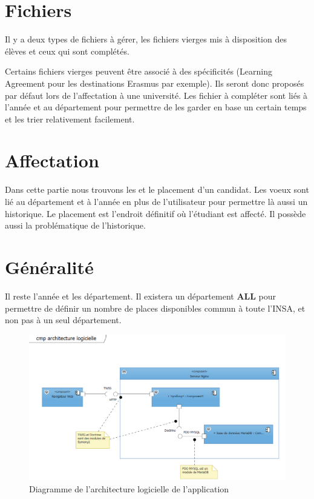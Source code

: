 \section{Fichiers}

Il y a deux types de fichiers à gérer, les fichiers vierges mis à disposition des élèves et ceux qui sont complétés.

Certains fichiers vierges peuvent être associé à des spécificités (Learning Agreement pour les destinations Erasmus par exemple). Ils seront donc proposés par défaut lors de l'affectation à une université.
Les fichier à compléter sont liés à l'année et au département pour permettre de les garder en base un certain temps et les trier relativement facilement.

\section{Affectation}

Dans cette partie nous trouvons les \voe et le placement d'un candidat. Les voeux sont lié au département et à l'année en plus de l'utilisateur pour permettre là aussi un historique.
Le placement est l'endroit définitif où l'étudiant est affecté. Il possède aussi la problématique de l'historique.

\section{Généralité}

Il reste l'année et les département. 
Il existera un département \textbf{ALL} pour permettre de définir un nombre de places disponibles commun à toute l'INSA, et non pas à un seul département.


\begin{figure}[h!]
	\centering
	\includegraphics[scale=0.5]{ArchitectureLogicielle/archi_logicielle.png}
	\caption{Diagramme de l'architecture logicielle de l'application}
	\label{fig::archi_logicielle}
\end{figure}